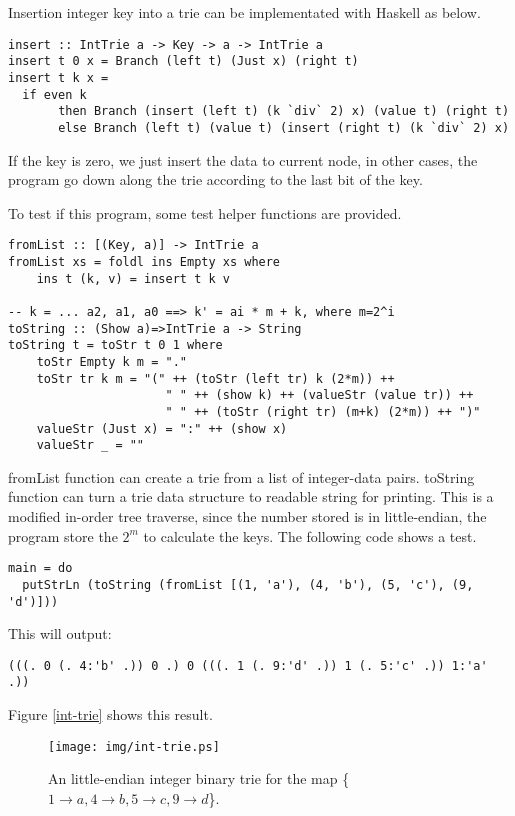 \documentclass{article}
\begin{document}
Insertion integer key into a trie can be implementated with Haskell as below.

\lstset{language=Haskell}
\begin{lstlisting}
insert :: IntTrie a -> Key -> a -> IntTrie a
insert t 0 x = Branch (left t) (Just x) (right t)
insert t k x = 
  if even k
       then Branch (insert (left t) (k `div` 2) x) (value t) (right t)
       else Branch (left t) (value t) (insert (right t) (k `div` 2) x)
\end{lstlisting}

If the key is zero, we just insert the data to current node, in other
cases, the program go down along the trie according to the last bit
of the key.

To test if this program, some test helper functions are provided.

\begin{lstlisting}
fromList :: [(Key, a)] -> IntTrie a
fromList xs = foldl ins Empty xs where
    ins t (k, v) = insert t k v

-- k = ... a2, a1, a0 ==> k' = ai * m + k, where m=2^i
toString :: (Show a)=>IntTrie a -> String
toString t = toStr t 0 1 where
    toStr Empty k m = "."
    toStr tr k m = "(" ++ (toStr (left tr) k (2*m)) ++
                      " " ++ (show k) ++ (valueStr (value tr)) ++
                      " " ++ (toStr (right tr) (m+k) (2*m)) ++ ")"
    valueStr (Just x) = ":" ++ (show x)
    valueStr _ = ""
\end{lstlisting}

fromList function can create a trie from a list of integer-data pairs.
toString function can turn a trie data structure to readable string
for printing. This is a modified in-order tree traverse, since the number
stored is in little-endian, the program store the $2^m$ to calculate
the keys. The following code shows a test.

\begin{lstlisting}
main = do
  putStrLn (toString (fromList [(1, 'a'), (4, 'b'), (5, 'c'), (9, 'd')]))
\end{lstlisting}

This will output:
\begin{verbatim}
(((. 0 (. 4:'b' .)) 0 .) 0 (((. 1 (. 9:'d' .)) 1 (. 5:'c' .)) 1:'a' .))
\end{verbatim}

Figure \ref{int-trie} shows this result. 
\begin{figure}[htbp]
       \begin{center}
	\texttt{[image: img/int-trie.ps]}
        \caption{An little-endian integer binary trie for the map 
          \{$ 1 \rightarrow a, 4 \rightarrow b, 5 \rightarrow c, 9 \rightarrow d$\}.} 
        \label{fig:int-trie}
       \end{center}
\end{figure}
\end{document}
